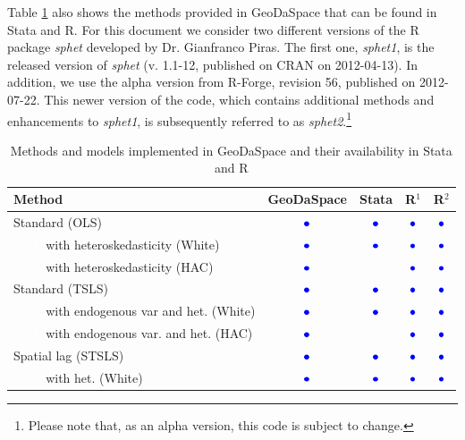 \documentclass{article}
\begin{document}
Table \ref{t:methods} also shows the methods provided in GeoDaSpace that can be found in Stata and R. For this document we consider two different versions of the R package \emph{sphet} developed by Dr. Gianfranco Piras. The first one, \emph{sphet1}, is the released version of \emph{sphet} (v. 1.1-12, published on CRAN on 2012-04-13). In addition, we use the alpha version from R-Forge, revision 56, published on 2012-07-22. This newer version of the code, which contains additional methods and enhancements to \emph{sphet1}, is subsequently referred to as \emph{sphet2}.\footnote{Please note that, as an alpha version, this code is subject to change.}


\begin{table}[htpb]
\caption{Methods and models implemented in GeoDaSpace and their availability in Stata and R}
\label{t:methods}
\centering
\begin{small}
\begin{tabular}{l|cccc} \hline
\textbf{Method}&\textbf{GeoDaSpace}&\textbf{Stata}&\textbf{R$^1$}&\textbf{R$^2$}\\ \hline
Standard (OLS) &{\LARGE$\textcolor{blue}\bullet$}&{\LARGE$\textcolor{blue}\bullet$}&{\LARGE$\textcolor{blue}\bullet$}&{\LARGE$\textcolor{blue}\bullet$}\\
\textcolor{white}{XXX} with heteroskedasticity (White)&{\LARGE$\textcolor{blue}\bullet$}&{\LARGE$\textcolor{blue}\bullet$}&{\LARGE$\textcolor{blue}\bullet$}&{\LARGE$\textcolor{blue}\bullet$}\\
\textcolor{white}{XXX} with heteroskedasticity (HAC)&{\LARGE$\textcolor{blue}\bullet$}&&{\LARGE$\textcolor{blue}\bullet$}&{\LARGE$\textcolor{blue}\bullet$}\\
Standard (TSLS)&{\LARGE$\textcolor{blue}\bullet$}&{\LARGE$\textcolor{blue}\bullet$}&{\LARGE$\textcolor{blue}\bullet$}&{\LARGE$\textcolor{blue}\bullet$}\\
\textcolor{white}{XXX} with endogenous var and het. (White)&{\LARGE$\textcolor{blue}\bullet$}&{\LARGE$\textcolor{blue}\bullet$}&{\LARGE$\textcolor{blue}\bullet$}&{\LARGE$\textcolor{blue}\bullet$}\\
\textcolor{white}{XXX} with endogenous var. and het. (HAC)&{\LARGE$\textcolor{blue}\bullet$}&&{\LARGE$\textcolor{blue}\bullet$}&{\LARGE$\textcolor{blue}\bullet$}\\
Spatial lag (STSLS)&{\LARGE$\textcolor{blue}\bullet$}&{\LARGE$\textcolor{blue}\bullet$}&{\LARGE$\textcolor{blue}\bullet$}&{\LARGE$\textcolor{blue}\bullet$}\\
\textcolor{white}{XXX} with het. (White)&{\LARGE$\textcolor{blue}\bullet$}&{\LARGE$\textcolor{blue}\bullet$}&{\LARGE$\textcolor{blue}\bullet$}&{\LARGE$\textcolor{blue}\bullet$}\\

\end{tabular}
\end{small}
\end{table}
\end{document}
